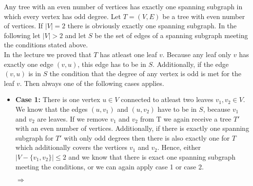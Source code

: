 \documentclass[a4paper]{article}
\begin{document}
\begin{solution}{6}
		\begin{theorem}{Any tree with an even number of vertices has exactly one spanning subgraph in which every vertex has odd degree.}
			Let $T=(V, E)$ be a tree with even number of vertices. If $|V|=2$ there is obviously exactly one spanning subgraph. 
			In the following let $|V|>2$ and let $S$ be the set of edges of a spanning subgraph meeting the conditions stated above. \\
			In the lecture we proved that $T$ has atleast one leaf $v$. 
			Because any leaf only $v$ has exactly one edge $(v,u)$, this edge has to be in $S$. 
			Additionally, if the edge $(v,u)$ is in $S$ the condition that the degree of any vertex is odd is met for the leaf $v$. 
			Then always one of the following cases applies. 
			\begin{itemize}
				\item \textbf{Case 1:} There is one vertex $u \in V$ connected to atleast two leaves $v_1, v_2 \in V$. \\
				We know that the edges $(u,v_1)$ and $(u,v_2)$ have to be in $S$, because $v_1$ and $v_2$ are leaves. 
				If we remove $v_1$ and $v_2$ from T we again receive a tree $T'$ with an even number of vertices. 
				Additionally, if there is exactly one spanning subgraph for $T'$ with only odd degrees then there is also exactly one for $T$ which additionally covers the vertices $v_1$ and $v_2$. 
				Hence, either $|V- \{v_1,v_2\}| \leq 2$ and we know that there is exact one spanning subgraph meeting the conditions, or we can again apply case 1 or case 2. 
				
				\begin{center}
				 $\Rightarrow$
			\end{center}
			

\end{itemize}
\end{theorem}
\end{solution}
\end{document}
